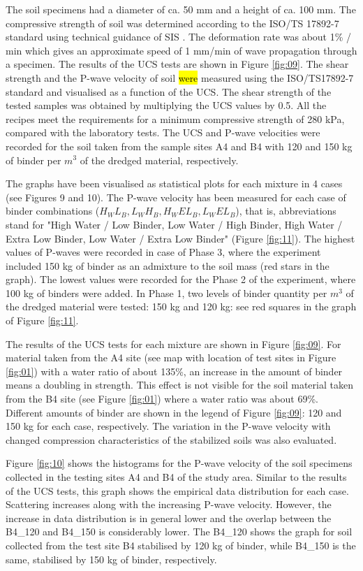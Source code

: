 \documentclass{amestyle}
\begin{document}
The soil specimens had a diameter of ca. 50 mm and a height of ca. 100 mm. The compressive strength of soil was determined according to the ISO/TS 17892-7 standard using technical guidance of SIS \cite{SIS2017}. The deformation rate was about 1\% / min which gives an approximate speed of 1 mm/min of wave propagation through a specimen. The results of the UCS tests are shown in Figure \ref{fig:09}. The shear strength and the P-wave velocity of soil \hl{were} measured using the ISO/TS17892-7 standard and visualised as a function of the UCS. The shear strength of the tested samples was obtained by multiplying the UCS values by 0.5. All the recipes meet the requirements for a minimum compressive strength of 280 kPa, compared with the laboratory tests. The UCS and P-wave velocities were recorded for the soil taken from the sample sites A4 and B4 with 120 and 150 kg of binder per $m^3$ of the dredged material, respectively. 

The graphs have been visualised as statistical plots for each mixture in 4 cases (see Figures 9 and 10). The P-wave velocity has been measured for each case of binder combinations ($H_WL_B, L_WH_B, H_WEL_B, L_WEL_B$), that is, abbreviations stand for "High Water / Low Binder, Low Water / High Binder, High Water / Extra Low Binder, Low Water / Extra Low Binder" (Figure \ref{fig:11}). The highest values of P-waves were recorded in case of Phase 3, where the experiment included 150 kg of binder as an admixture to the soil mass (red stars in the graph). The lowest values were recorded for the Phase 2 of the experiment, where 100 kg of binders were added. In Phase 1, two levels of binder quantity per $m^3$ of the dredged material were tested: 150 kg and 120 kg: see red squares in the graph of Figure \ref{fig:11}.

The results of the UCS tests for each mixture are shown in Figure \ref{fig:09}. For material taken from the A4 site (see map with location of test sites in Figure \ref{fig:01}) with a water ratio of about 135\%, an increase in the amount of binder means a doubling in strength. This effect is not visible for the soil material taken from the B4 site (see Figure \ref{fig:01}) where a water ratio was about 69\%. Different amounts of binder are shown in the legend of Figure \ref{fig:09}: 120 and 150 kg for each case, respectively. The variation in the P-wave velocity with changed compression characteristics of the stabilized soils was also evaluated. 

Figure \ref{fig:10} shows the histograms for the P-wave velocity of the soil specimens collected in the testing sites A4 and B4 of the study area. Similar to the results of the UCS tests, this graph shows the empirical data distribution for each case. Scattering increases along with the increasing P-wave velocity. However, the increase in data distribution is in general lower and the overlap between the B4\_120 and B4\_150 is considerably lower. The B4\_120 shows the graph for soil collected from the test site B4 stabilised by 120 kg of binder, while B4\_150 is the same, stabilised by 150 kg of binder, respectively. 
\end{document}
